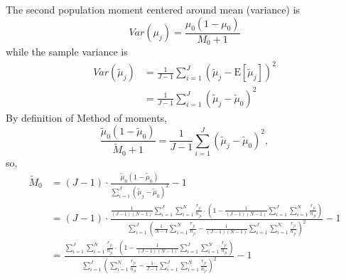 \documentclass[11pt,reqno]{amsart}
\begin{document}
The second population moment centered around mean (variance) is
\begin{equation}
 Var(\mu_j) = \frac{\mu_0(1-\mu_0)}{M_0+1}
\end{equation}
while the sample variance is
\begin{equation}
 \begin{split}
  Var(\tilde{\mu}_j) &= \frac{1}{J-1}\sum_{i=1}^J(\tilde{\mu}_j-\text{E}[\tilde{\mu}_j])^2\\ &= \frac{1}{J-1}\sum_{i=1}^J(\tilde{\mu}_j-\tilde{\mu}_0)^2
 \end{split}
\end{equation}
By definition of Method of moments,
\begin{equation}
  \frac{\tilde{\mu}_0(1-\tilde{\mu}_0)}{\tilde{M}_0+1} = \frac{1}{J-1}\sum_{i=1}^J(\tilde{\mu}_j-\tilde{\mu}_0)^2,
\end{equation}
so,
\begin{equation}
\begin{split}
 \tilde{M}_0 &= (J-1)\cdot\frac{\tilde{\mu}_0(1-\tilde{\mu}_0)}{\sum_{i=1}^J(\tilde{\mu}_j-\tilde{\mu}_0)^2}-1\\ &= (J-1)\cdot\frac{\frac{1}{(J-1)(N-1)}\sum_{i=1}^J\sum_{i=1}^N\frac{r_{ji}}{n_{ji}}\cdot\left(1-\frac{1}{(J-1)(N-1)}\sum_{i=1}^J\sum_{i=1}^N\frac{r_{ji}}{n_{ji}}\right)}{\sum_{i=1}^J\left(\frac{1}{N-1}\sum_{i=1}^N\frac{r_{ji}}{n_{ji}}-\frac{1}{(J-1)(N-1)}\sum_{i=1}^J\sum_{i=1}^N\frac{r_{ji}}{n_{ji}}\right)^2}-1\\ &= \frac{\sum_{i=1}^J\sum_{i=1}^N\frac{r_{ji}}{n_{ji}}\cdot\left(1-\frac{1}{(J-1)(N-1)}\sum_{i=1}^J\sum_{i=1}^N\frac{r_{ji}}{n_{ji}}\right)}{\sum_{i=1}^J\left(\sum_{i=1}^N\frac{r_{ji}}{n_{ji}}-\frac{1}{J-1}\sum_{i=1}^J\sum_{i=1}^N\frac{r_{ji}}{n_{ji}}\right)^2}-1
\end{split}
\end{equation}


\end{document}
